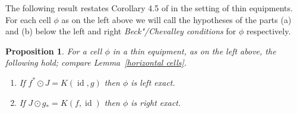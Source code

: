 \documentclass[preprint, a4paper]{elsarticle}
\newtheorem{proposition}[theorem]{Proposition}
\theoremstyle{definition}
\theoremstyle{remark}
\providecommand{\lemref}[1]{Lemma~\ref{#1}}
\DeclareMathOperator{\id}{id}
\providecommand{\2}{\mathsf 2}
\providecommand{\hc}{\odot}
\begin{document}
  The following result restates Corollary 4.5 of \cite{Koudenburg14} in the setting of thin equipments. For each cell $\phi$ as on the left above we will call the hypotheses of the parts (a) and (b) below the left and right \emph{Beck"/Chevalley conditions} for $\phi$ respectively.
  \begin{proposition}
  	For a cell $\phi$ in a thin equipment, as on the left above, the following hold; compare \lemref{horizontal cells}.
  	\begin{enumerate}[label=\textup{(\alph*)}]
  		\item If $f^* \hc J = K(\id, g)$ then $\phi$ is left exact.
  		\item If $J \hc g_* = K(f, \id)$ then $\phi$ is right exact.
  	\end{enumerate}
  \end{proposition}
  
\end{document}
